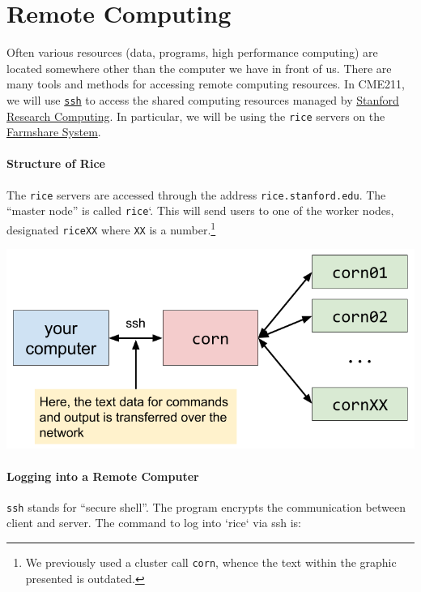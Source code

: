 \documentclass[12pt,letterpaper,twoside]{article}
\begin{document}
\section{Remote Computing}
Often various resources (data, programs, high performance computing) are located
somewhere other than the computer we have in front of us.  There are many tools
and methods for accessing remote computing resources.  In CME211, we will use
\href{https://en.wikipedia.org/wiki/Secure_Shell}{\texttt{ssh}} 
to access the shared computing resources managed by 
\href{https://srcc.stanford.edu/}{Stanford Research Computing}.  In particular, we will be using the \texttt{rice} servers on
the \href{https://web.stanford.edu/group/farmshare/cgi-bin/wiki/index.php/Main_Page}
{Farmshare System}.

\paragraph{Structure of Rice}
The \texttt{rice} servers are accessed through the address \texttt{rice.stanford.edu}.  The
``master node'' is called \texttt{rice}`.  This will send users to one of the worker
nodes, designated \texttt{riceXX} where \texttt{XX} is a number.\footnote{We previously used 
a cluster call \texttt{corn}, whence the text within the graphic presented is outdated.}

\begin{center}
  \centering
  \includegraphics[scale=0.35]{fig/remote-computing}
\end{center}

\paragraph{Logging into a Remote Computer}
\texttt{ssh} stands for ``secure shell''.  The program encrypts the communication between
client and server.  The command to log into `rice` via ssh is:
\end{document}
